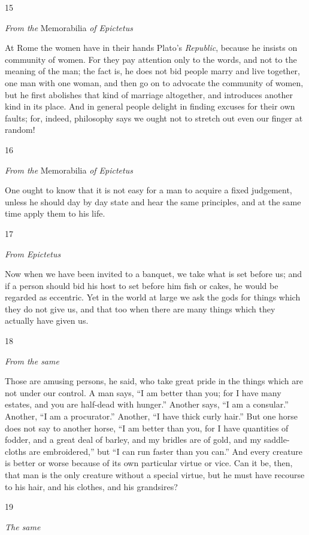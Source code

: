 15

\emph{From the} Memorabilia \emph{of Epictetus}

At Rome the women have in their hands Plato's \emph{Republic}, because he insists on community of women. For they pay attention only to the words, and not to the meaning of the man; the fact is, he does not bid people marry and live together, one man with one woman, and then go on to advocate the community of women, but he first abolishes that kind of marriage altogether, and introduces another kind in its place. And in general people delight in finding excuses for their own faults; for, indeed, philosophy says we ought not to stretch out even our finger at random!

16

\emph{From the} Memorabilia \emph{of Epictetus}

One ought to know that it is not easy for a man to acquire a fixed judgement, unless he should day by day state and hear the same principles, and at the same time apply them to his life.

17

\emph{From Epictetus}

Now when we have been invited to a banquet, we take what is set before us; and if a person should bid his host to set before him fish or cakes, he would be regarded as eccentric. Yet in the world at large we ask the gods for things which they do not give us, and that too when there are many things which they actually have given us.

18

\emph{From the same}

Those are amusing persons, he said, who take great pride in the things which are not under our control. A man says, ``I am better than you; for I have many estates, and you are half-dead with hunger.'' Another says, ``I am a consular.'' Another, ``I am a procurator.'' Another, ``I have thick curly hair.'' But one horse does not say to another horse, ``I am better than you, for I have quantities of fodder, and a great deal of barley, and my bridles are of gold, and my saddle-cloths are embroidered,'' but ``I can run faster than you can.'' And every creature is better or worse because of its own particular virtue or vice. Can it be, then, that man is the only creature without a special virtue, but he must have recourse to his hair, and his clothes, and his grandsires?

19

\emph{The same}

